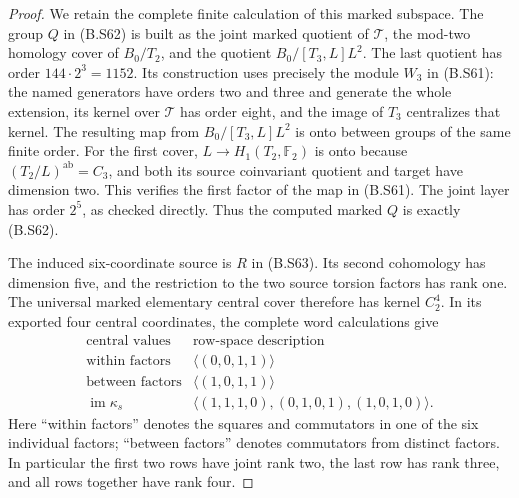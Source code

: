 \begin{proof}
We retain the complete finite calculation of this
marked subspace.  The group $Q$ in (B.S62) is built as
the joint marked quotient of $\mathcal T$, the
mod-two homology cover of $B_0/T_2$, and the quotient
$B_0/[T_3,L]L^2$.  The last quotient has order
$144\cdot2^3=1152$.  Its construction uses precisely
the module $W_3$ in (B.S61): the named generators
have orders two and three and generate the whole
extension, its kernel over $\mathcal T$ has order
eight, and the image of $T_3$ centralizes that kernel.
The resulting map from $B_0/[T_3,L]L^2$ is onto between
groups of the same finite order.  For the first
cover, $L\to H_1(T_2,\mathbb F_2)$ is onto because
$(T_2/L)^{\mathrm{ab}}=C_3$, and both its source
coinvariant quotient and target have dimension two.
This verifies the first factor of the map in (B.S61).
The joint layer has order $2^5$, as checked directly.
Thus the computed marked $Q$ is exactly (B.S62).

The induced six-coordinate source is $R$ in (B.S63).
Its second cohomology has dimension five, and the
restriction to the two source torsion factors has rank
one.  The universal marked elementary central cover
therefore has kernel $C_2^4$.  In its exported four
central coordinates, the complete word calculations
give
\[
\begin{array}{c|c}
 \text{central values}&\text{row-space description}\\ \hline
 \text{within factors}
       &\langle(0,0,1,1)\rangle\\
 \text{between factors}
       &\langle(1,0,1,1)\rangle\\
 \operatorname{im}\kappa_s
       &\langle(1,1,1,0),(0,1,0,1),(1,0,1,0)\rangle.
\end{array}                                                     \tag{B.S74}
\]
Here ``within factors'' denotes the squares and
commutators in one of the six individual factors;
``between factors'' denotes commutators from distinct
factors.  In particular the first two rows have joint rank two,
the last row has rank three, and all rows together
have rank four.


\end{proof}
